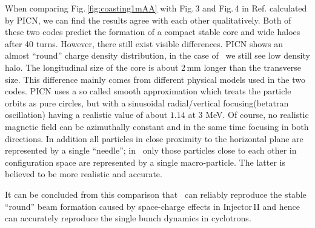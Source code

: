 \documentclass[aps,prstab,onecolumn,superscriptaddress,showpacs]{revtex4}
\begin{document}
When comparing Fig.\,\ref{fig:coasting1mAA} with Fig.\,3 and Fig.\,4 in Ref.  calculated by PICN, we can find the results agree with each 
other qualitatively. Both of these two codes predict the formation of a compact stable core and  wide haloes after 40 turns.
However, there still exist visible differences. PICN shows an almost ``round'' charge density distribution, in the case of \opalcycl\,  we still see low density halo. The longitudinal size of the core is about 2\,mm longer than the transverse size. This difference mainly comes from different physical models used in the two codes. 
PICN uses a so called smooth approximation which treats the particle orbits
as pure circles, but with a sinusoidal radial/vertical focusing(betatran oscillation) having a realistic value of about $1.14$ at 3 MeV. 
Of course, no realistic magnetic field can be azimuthally constant and in the same time focusing in both directions\cite{adapconv}. 
In addition all particles in close proximity to the horizontal plane are represented by a single ``needle''; in \opalcycl\  only those particles close to each other in configuration space are represented by a single macro-particle. The
latter is believed to be more realistic and accurate. 

It can be concluded from this comparison that \opalcycl\ can reliably reproduce the stable ``round'' beam formation caused by space-charge effects in Injector\,II and hence can accurately  reproduce the single bunch dynamics in cyclotrons.
\end{document}
